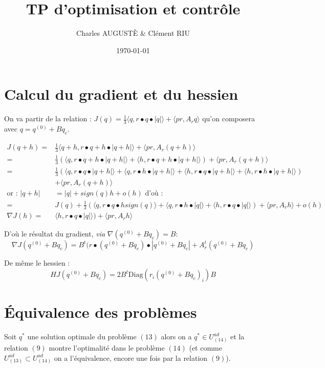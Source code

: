 \documentclass[12pt, letterpaper]{article}
\title{TP d'optimisation et contrôle}
\author{Charles AUGUSTÈ \& Clément RIU}
\date{\today}
\begin{document}
\section{Calcul du gradient et du hessien}

On va partir de la relation : $ J(q) = \frac{1}{3}\langle q , r \bullet q \bullet | q | \rangle + \langle pr , A_r q \rangle$ qu'on composera avec $q = q^{(0)} + B q_c$.

\begin{align*}
J(q+h) =& \frac{1}{3}\langle q + h , r \bullet q + h \bullet | q + h | \rangle + \langle pr , A_r (q + h) \rangle \\
=& \frac{1}{3}(\langle q , r \bullet q + h \bullet | q + h | \rangle + \langle h , r \bullet q + h \bullet | q + h | \rangle) + \langle pr , A_r (q + h) \rangle \\
=& \frac{1}{3}(\langle q , r \bullet q \bullet | q + h | \rangle + \langle q , r \bullet h \bullet | q + h | \rangle + \langle h , r \bullet q \bullet | q + h | \rangle + \langle h , r \bullet h \bullet | q + h | \rangle) \\ &+ \langle pr , A_r (q + h) \rangle \\ 
\text{or : } | q + h | &= |q| + sign(q) h + o(h) \text{ d'où :} \\
=& J(q) + \frac{1}{3}(\langle q , r \bullet q \bullet h sign(q) \rangle + \langle q , r \bullet h \bullet | q | \rangle + \langle h , r \bullet q \bullet | q | \rangle) + \langle pr , A_r h \rangle + o(h) \\
\nabla J(h) =& \langle h , r \bullet q \bullet | q | \rangle) + \langle pr , A_r h \rangle
\end{align*}

D'où le résultat du gradient, \emph{via} $\nabla(q^{(0)} + B q_c) = B$: 
$$ \nabla J (q^{(0)} + B q_c) = B^t(r \bullet (q^{(0)} + B q_c) \bullet | q^{(0)} + B q_c | + A_r^t(q^{(0)} + B q_c) $$

De même le hessien :
$$ H J (q^{(0)} + B q_c) = 2 B^t \text{Diag}(r_i (q^{(0)} + B q_c)_i) B $$

\section{Équivalence des problèmes}

Soit $q^*$ une solution optimale du problème $(13)$ alors on a $q^* \in U^{ad}_{(14)}$ et la relation $(9)$ montre l'optimalité dans le problème $(14)$ (et comme $U_{(13)}^{ad} \subset U_{(14)}^{ad}$ on a l'équivalence, encore une fois par la relation $(9)$).
\end{document}

